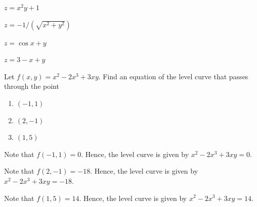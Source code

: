 \begin{solution}
    \begin{ppart}
        $z = x^2 y + 1$
    \end{ppart}
    \begin{ppart}
        $z = -1/(\sqrt{x^2 + y^2})$
    \end{ppart}
    \begin{ppart}
        $z = \cos{x + y}$
    \end{ppart}
    \begin{ppart}
        $z = 3 - x + y$
    \end{ppart}
\end{solution}

\begin{problem}
    Let $f(x, y) = x^2 - 2x^3 + 3xy$. Find an equation of the level curve that passes through the point
    \begin{enumerate}
        \item $(-1, 1)$
        \item $(2, -1)$
        \item $(1, 5)$
    \end{enumerate}
\end{problem}
\clearpage
\begin{solution}
    \begin{ppart}
        Note that $f(-1, 1) = 0$. Hence, the level curve is given by $x^2 - 2x^3 + 3xy = 0$.
    \end{ppart}
    \begin{ppart}
        Note that $f(2, -1) = -18$. Hence, the level curve is given by $x^2 - 2x^3 + 3xy = -18$.
    \end{ppart}
    \begin{ppart}
        Note that $f(1, 5) = 14$. Hence, the level curve is given by $x^2 - 2x^3 + 3xy = 14$.
    \end{ppart}
\end{solution}

